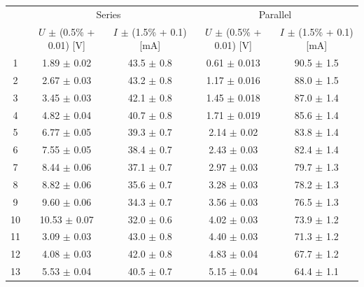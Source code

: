 \documentclass[a4paper]{article}
\begin{document}
\begin{table}[H]
	\centering
	\begin{tabular}{ccc||cc}
		\hline
		   & \multicolumn{2}{c||}{Series} & \multicolumn{2}{c}{Parallel}                                                               \\
		   & $U$ $\pm$ (0.5\% + 0.01) [V] & $I$ $\pm$ (1.5\% + 0.1) [mA] & $U$ $\pm$ (0.5\% + 0.01) [V] & $I$ $\pm$ (1.5\% + 0.1) [mA] \\
		\hline
		1  & 1.89  $\pm$ 0.02             & 43.5   $\pm$ 0.8             & 0.61   $\pm$ 0.013           & 90.5 $\pm$ 1.5               \\
		2  & 2.67  $\pm$ 0.03             & 43.2   $\pm$ 0.8             & 1.17   $\pm$ 0.016           & 88.0 $\pm$ 1.5               \\
		3  & 3.45  $\pm$ 0.03             & 42.1   $\pm$ 0.8             & 1.45   $\pm$ 0.018           & 87.0 $\pm$ 1.4               \\
		4  & 4.82  $\pm$ 0.04             & 40.7   $\pm$ 0.8             & 1.71   $\pm$ 0.019           & 85.6 $\pm$ 1.4               \\
		5  & 6.77  $\pm$ 0.05             & 39.3   $\pm$ 0.7             & 2.14   $\pm$ 0.02            & 83.8 $\pm$ 1.4               \\
		6  & 7.55  $\pm$ 0.05             & 38.4   $\pm$ 0.7             & 2.43   $\pm$ 0.03            & 82.4 $\pm$ 1.4               \\
		7  & 8.44  $\pm$ 0.06             & 37.1   $\pm$ 0.7             & 2.97   $\pm$ 0.03            & 79.7 $\pm$ 1.3               \\
		8  & 8.82  $\pm$ 0.06             & 35.6   $\pm$ 0.7             & 3.28   $\pm$ 0.03            & 78.2 $\pm$ 1.3               \\
		9  & 9.60  $\pm$ 0.06             & 34.3   $\pm$ 0.7             & 3.56   $\pm$ 0.03            & 76.5 $\pm$ 1.3               \\
		10 & 10.53 $\pm$ 0.07             & 32.0   $\pm$ 0.6             & 4.02   $\pm$ 0.03            & 73.9 $\pm$ 1.2               \\
		11 & 3.09  $\pm$ 0.03             & 43.0   $\pm$ 0.8             & 4.40   $\pm$ 0.03            & 71.3 $\pm$ 1.2               \\
		12 & 4.08  $\pm$ 0.03             & 42.0   $\pm$ 0.8             & 4.83   $\pm$ 0.04            & 67.7 $\pm$ 1.2               \\
		13 & 5.53  $\pm$ 0.04             & 40.5   $\pm$ 0.7             & 5.15   $\pm$ 0.04            & 64.4 $\pm$ 1.1               \\

\end{tabular}
\end{table}
\end{document}
